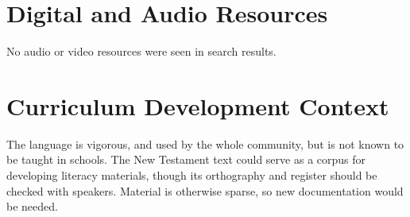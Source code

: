 \documentclass[12pt]{article}
\begin{document}
\section{Digital and Audio Resources}
No audio or video resources were seen in search results.

\section{Curriculum Development Context}
The language is vigorous, and used by the whole community, but is not known to be taught in schools. The New Testament text could serve as a corpus for developing literacy materials, though its orthography and register should be checked with speakers. Material is otherwise sparse, so new documentation would be needed.
\end{document}
